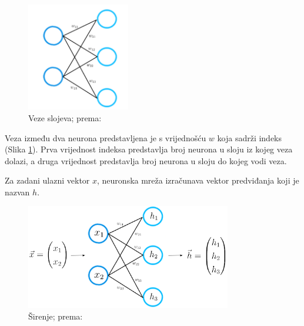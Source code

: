 \documentclass[]{foi} %
\begin{document}
\begin{figure}[!ht]
    \centering
    \includegraphics[width=0.4\textwidth]{slike/struktura.png}
    \caption{Veze slojeva; prema: \cite{builtin1}}
    \label{fig:struktura}
\end{figure}

Veza između dva neurona predstavljena je s vrijednošću $w$ koja sadrži indeks (Slika \ref{fig:struktura}). Prva vrijednost indeksa predstavlja broj neurona u sloju iz kojeg veza dolazi, a druga vrijednost predstavlja broj neurona u sloju do kojeg vodi veza.

Za zadani ulazni vektor $x$, neuronska mreža izračunava vektor predviđanja koji je nazvan $h$.

\begin{figure}[!ht]
    \centering
    \includegraphics[width=0.8\textwidth]{slike/proces.png}
    \caption{Širenje; prema: \cite{builtin1}}
    \label{fig:proces}
\end{figure}
\end{document}
